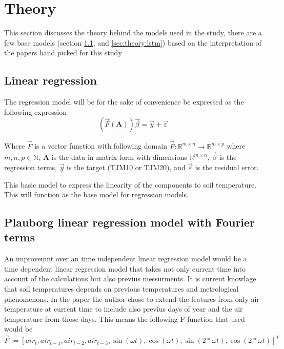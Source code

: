 \section{Theory}\label{sec:theory}

This section discusses the theory behind the models used in the study, there are a few base models (section \ref{sec:theory:linreg}, and \ref{sec:theory:lstm}) based on the interpretation of the papers hand picked for this study

\subsection{Linear regression}\label{sec:theory:linreg}

The regression model will be for the sake of convenience be expressed as the following expression
$$
\left(\vec{F}(\mathbf{A})\right)\vec{\beta}=\vec{y}+\vec{\varepsilon}
$$

Where $\vec{F}$ is a vector function with following domain $\vec{F}:\mathbb{R}^{m\times n}\to \mathbb{R}^{m\times p}$ where $m,n,p\in \mathbb{N}$, $\mathbf{A}$ is the data in matrix form with dimensions $\mathbb{R}^{m\times n}$, $\vec{\beta}$ is the regression terms, $\vec{y}$ is the target (TJM10 or TJM20), and $\vec{\varepsilon}$ is the residual error.

This basic model to express the linearity of the components to soil temperature. This will function as the base model for regression models. 

\subsection[Plauborg Regression]{Plauborg linear regression model with Fourier terms}\label{sec:theory:pluborg}

An improvemnt over an time independent linear regression model would be a time dependent linear regression model that takes not only current time into account of the calculations but also previus messurments. It is current knowlage that soil temperatures depends on previous temperatures and metrological phenomenons. In the paper  the author chose to extend the features from only air temperature at current time to include also previus days of year and the air temperature from those days. This means the following F function that \citeauthor{plauborg_simple_2002} used would be 
$$
\vec{F} := [air_t , air_{t-1}, air_{t-2}, air_{t-3}, \sin(\omega t) , \cos(\omega t), \sin(2*\omega t), \cos(2*\omega t)]^T
$$

